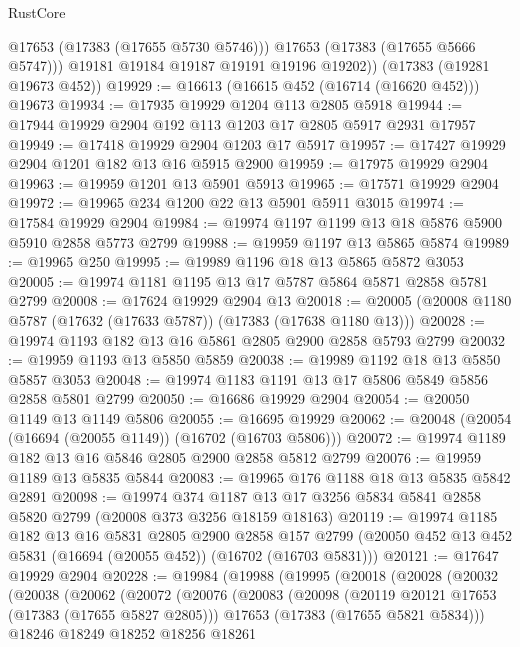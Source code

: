\begin{lexlean}{RustCore}
\begin{coremodule}
            @17653
            (@17383 (@17655 @5730 @5746)))
          @17653
          (@17383 (@17655 @5666 @5747)))
        @19181
        @19184
        @19187
        @19191
        @19196
        @19202))
    (@17383 (@19281 @19673 @452))
@19929 := @16613 (@16615 @452 (@16714 (@16620 @452))) @19673
@19934 := @17935 @19929 @1204 @113 @2805 @5918
@19944 := @17944 @19929 @2904 @192 @113 @1203 @17 @2805 @5917 @2931 @17957
@19949 := @17418 @19929 @2904 @1203 @17 @5917
@19957 := @17427 @19929 @2904 @1201 @182 @13 @16 @5915 @2900
@19959 := @17975 @19929 @2904
@19963 := @19959 @1201 @13 @5901 @5913
@19965 := @17571 @19929 @2904
@19972 := @19965 @234 @1200 @22 @13 @5901 @5911 @3015
@19974 := @17584 @19929 @2904
@19984 := @19974 @1197 @1199 @13 @18 @5876 @5900 @5910 @2858 @5773 @2799
@19988 := @19959 @1197 @13 @5865 @5874
@19989 := @19965 @250
@19995 := @19989 @1196 @18 @13 @5865 @5872 @3053
@20005 := @19974 @1181 @1195 @13 @17 @5787 @5864 @5871 @2858 @5781 @2799
@20008 := @17624 @19929 @2904 @13
@20018 := @20005 (@20008 @1180 @5787 (@17632 (@17633 @5787)) (@17383 (@17638 @1180 @13)))
@20028 := @19974 @1193 @182 @13 @16 @5861 @2805 @2900 @2858 @5793 @2799
@20032 := @19959 @1193 @13 @5850 @5859
@20038 := @19989 @1192 @18 @13 @5850 @5857 @3053
@20048 := @19974 @1183 @1191 @13 @17 @5806 @5849 @5856 @2858 @5801 @2799
@20050 := @16686 @19929 @2904
@20054 := @20050 @1149 @13 @1149 @5806
@20055 := @16695 @19929
@20062 := @20048 (@20054 (@16694 (@20055 @1149)) (@16702 (@16703 @5806)))
@20072 := @19974 @1189 @182 @13 @16 @5846 @2805 @2900 @2858 @5812 @2799
@20076 := @19959 @1189 @13 @5835 @5844
@20083 := @19965 @176 @1188 @18 @13 @5835 @5842 @2891
@20098 := @19974
    @374
    @1187
    @13
    @17
    @3256
    @5834
    @5841
    @2858
    @5820
    @2799
    (@20008 @373 @3256 @18159 @18163)
@20119 := @19974
    @1185
    @182
    @13
    @16
    @5831
    @2805
    @2900
    @2858
    @157
    @2799
    (@20050 @452 @13 @452 @5831 (@16694 (@20055 @452)) (@16702 (@16703 @5831)))
@20121 := @17647 @19929 @2904
@20228 := @19984
    (@19988
      (@19995
        (@20018
          (@20028
            (@20032
              (@20038
                (@20062
                  (@20072
                    (@20076
                      (@20083
                        (@20098
                          (@20119 @20121 @17653 (@17383 (@17655 @5827 @2805)))
                          @17653
                          (@17383 (@17655 @5821 @5834)))
                        @18246
                        @18249
                        @18252
                        @18256
                        @18261

\end{coremodule}
\end{lexlean}
